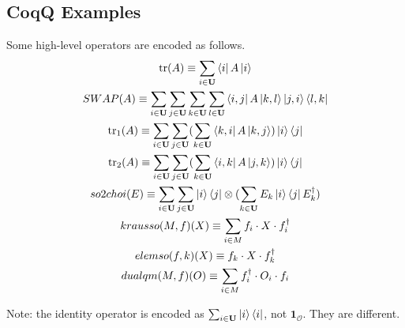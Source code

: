 \documentclass[manuscript, review, timestamp]{acmart}
\begin{document}
\subsection{CoqQ Examples}
\begin{definition}
  Some high-level operators are encoded as follows.  
  \begin{gather*}
    \mathrm{tr}(A) \equiv \sum_{i\in\mathbf{U}} \bra{i} A \ket{i} \\
    SWAP(A) \equiv \sum_{i\in\mathbf{U}}\sum_{j\in\mathbf{U}}\sum_{k\in\mathbf{U}}\sum_{l\in\mathbf{U}} \bra{i, j} A \ket{k, l} \ket{j, i}\bra{l, k} \\
    \mathrm{tr}_1(A) \equiv \sum_{i\in\mathbf{U}}\sum_{j\in\mathbf{U}} (\sum_{k\in\mathbf{U}} \bra{k, i} A \ket{k, j}) \ket{i}\bra{j} \\
    \mathrm{tr}_2(A) \equiv \sum_{i\in\mathbf{U}}\sum_{j\in\mathbf{U}} (\sum_{k\in\mathbf{U}} \bra{i, k} A \ket{j, k}) \ket{i}\bra{j} \\
    so2choi(E) \equiv \sum_{i\in\mathbf{U}}\sum_{j\in\mathbf{U}} \ket{i}\bra{j} \otimes (\sum_{k\in\mathbf{U}} E_k \ket{i}\bra{j} E_k^\dagger) \\
    krausso(M, f)(X) \equiv \sum_{i \in M} f_i \cdot X \cdot f_i^\dagger \\
    elemso(f, k)(X) \equiv f_k \cdot X \cdot f_k^\dagger \\
    dualqm(M, f)(O) \equiv \sum_{i\in M} f_i^\dagger \cdot O_i \cdot f_i
  \end{gather*}
\end{definition}

Note: the identity operator is encoded as $\sum_{i \in \mathbf{U}}\ket{i}\bra{i}$, not $\mathbf{1}_\mathcal{O}$. They are different.
\end{document}
